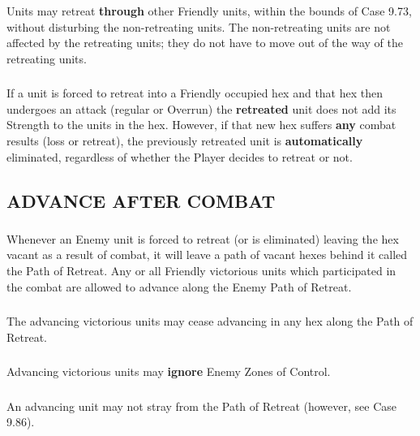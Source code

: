 \subsubsection{} Units may retreat \textbf{through} other Friendly units, within the bounds of Case 9.73, without disturbing the non-retreating units. The non-retreating units are not affected by the retreating units; they do not have to move out of the way of the retreating units.

\subsubsection{} If a unit is forced to retreat into a Friendly occupied hex and that hex then undergoes an attack (regular or Overrun) the \textbf{retreated} unit does not add its Strength to the units in the hex. However, if that new hex suffers \textbf{any} combat results (loss or retreat), the previously retreated unit is \textbf{automatically} eliminated, regardless of whether the Player decides to retreat or not.

\subsection{ADVANCE AFTER COMBAT}

\subsubsection{} Whenever an Enemy unit is forced to retreat (or is eliminated) leaving the hex vacant as a result of combat, it will leave a path of vacant hexes behind it called the Path of Retreat. Any or all Friendly victorious units which participated in the combat are allowed to advance along the Enemy Path of Retreat.

\subsubsection{} The advancing victorious units may cease advancing in any hex along the Path of Retreat.

\subsubsection{} Advancing victorious units may \textbf{ignore} Enemy Zones of Control.

\subsubsection{} An advancing unit may not stray from the Path of Retreat (however, see Case 9.86).

